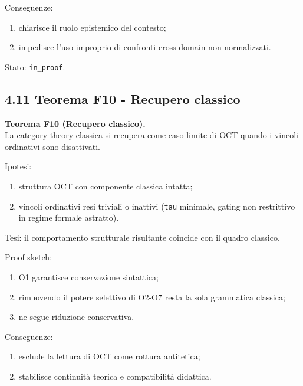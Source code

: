 Conseguenze:

\begin{enumerate}
\def\labelenumi{\arabic{enumi}.}
\tightlist
\item
  chiarisce il ruolo epistemico del contesto;
\item
  impedisce l'uso improprio di confronti cross-domain non normalizzati.
\end{enumerate}

Stato: \texttt{in\_proof}.

\subsection{4.11 Teorema F10 - Recupero classico}

\textbf{Teorema F10 (Recupero classico).}\\
La category theory classica si recupera come caso limite di OCT quando i vincoli ordinativi sono disattivati.

Ipotesi:

\begin{enumerate}
\def\labelenumi{\arabic{enumi}.}
\tightlist
\item
  struttura OCT con componente classica intatta;
\item
  vincoli ordinativi resi triviali o inattivi (\texttt{tau} minimale, gating non restrittivo in regime formale astratto).
\end{enumerate}

Tesi:
il comportamento strutturale risultante coincide con il quadro classico.

Proof sketch:

\begin{enumerate}
\def\labelenumi{\arabic{enumi}.}
\tightlist
\item
  O1 garantisce conservazione sintattica;
\item
  rimuovendo il potere selettivo di O2-O7 resta la sola grammatica classica;
\item
  ne segue riduzione conservativa.
\end{enumerate}

Conseguenze:

\begin{enumerate}
\def\labelenumi{\arabic{enumi}.}
\tightlist
\item
  esclude la lettura di OCT come rottura antitetica;
\item
  stabilisce continuità teorica e compatibilità didattica.
\end{enumerate}

